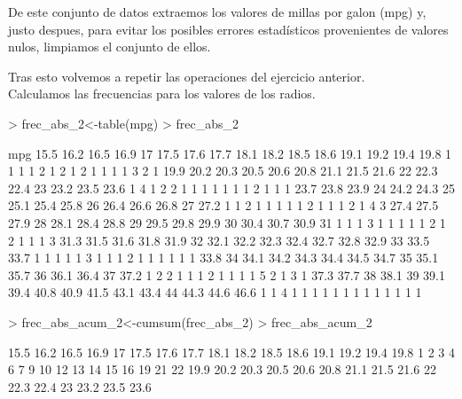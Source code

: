 \documentclass[a4paper]{article}
\begin{document}
De este conjunto de datos extraemos los valores de millas por galon (mpg) y, justo despues, para evitar los posibles errores estadísticos provenientes de valores nulos, limpiamos el conjunto de ellos.
\begin{Schunk}
\end{Schunk}

Tras esto volvemos a repetir las operaciones del ejercicio anterior. \\
Calculamos las frecuencias para los valores de los radios.
\begin{Schunk}
\begin{Sinput}
> frec_abs_2<-table(mpg)
> frec_abs_2
\end{Sinput}
\begin{Soutput}
mpg
15.5 16.2 16.5 16.9   17 17.5 17.6 17.7 18.1 18.2 18.5 18.6 19.1 19.2 19.4 19.8 
   1    1    1    1    2    1    2    1    2    1    1    1    1    3    2    1 
19.9 20.2 20.3 20.5 20.6 20.8 21.1 21.5 21.6   22 22.3 22.4   23 23.2 23.5 23.6 
   1    4    1    2    2    1    1    1    1    1    1    1    2    1    1    1 
23.7 23.8 23.9   24 24.2 24.3   25 25.1 25.4 25.8   26 26.4 26.6 26.8   27 27.2 
   1    1    2    1    1    1    1    1    2    1    1    1    2    1    4    3 
27.4 27.5 27.9   28 28.1 28.4 28.8   29 29.5 29.8 29.9   30 30.4 30.7 30.9   31 
   1    1    1    3    1    1    1    1    1    2    1    2    1    1    1    3 
31.3 31.5 31.6 31.8 31.9   32 32.1 32.2 32.3 32.4 32.7 32.8 32.9   33 33.5 33.7 
   1    1    1    1    1    3    1    1    1    2    1    1    1    1    1    1 
33.8   34 34.1 34.2 34.3 34.4 34.5 34.7   35 35.1 35.7   36 36.1 36.4   37 37.2 
   1    2    2    1    1    1    2    1    1    1    1    5    2    1    3    1 
37.3 37.7   38 38.1   39 39.1 39.4 40.8 40.9 41.5 43.1 43.4   44 44.3 44.6 46.6 
   1    1    4    1    1    1    1    1    1    1    1    1    1    1    1    1 
\end{Soutput}
\begin{Sinput}
> frec_abs_acum_2<-cumsum(frec_abs_2)
> frec_abs_acum_2
\end{Sinput}
\begin{Soutput}
15.5 16.2 16.5 16.9   17 17.5 17.6 17.7 18.1 18.2 18.5 18.6 19.1 19.2 19.4 19.8 
   1    2    3    4    6    7    9   10   12   13   14   15   16   19   21   22 
19.9 20.2 20.3 20.5 20.6 20.8 21.1 21.5 21.6   22 22.3 22.4   23 23.2 23.5 23.6 

\end{Soutput}
\end{Schunk}
\end{document}
